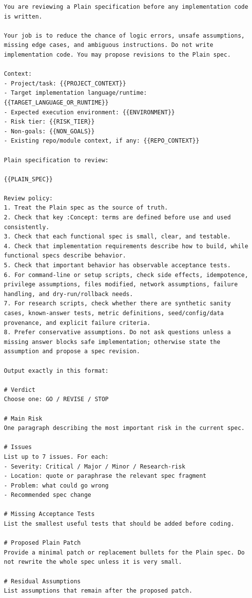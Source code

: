 \documentclass[11pt]{article}
\begin{document}
\begin{lstlisting}
You are reviewing a Plain specification before any implementation code is written.

Your job is to reduce the chance of logic errors, unsafe assumptions, missing edge cases, and ambiguous instructions. Do not write implementation code. You may propose revisions to the Plain spec.

Context:
- Project/task: {{PROJECT_CONTEXT}}
- Target implementation language/runtime: {{TARGET_LANGUAGE_OR_RUNTIME}}
- Expected execution environment: {{ENVIRONMENT}}
- Risk tier: {{RISK_TIER}}
- Non-goals: {{NON_GOALS}}
- Existing repo/module context, if any: {{REPO_CONTEXT}}

Plain specification to review:

{{PLAIN_SPEC}}

Review policy:
1. Treat the Plain spec as the source of truth.
2. Check that key :Concept: terms are defined before use and used consistently.
3. Check that each functional spec is small, clear, and testable.
4. Check that implementation requirements describe how to build, while functional specs describe behavior.
5. Check that important behavior has observable acceptance tests.
6. For command-line or setup scripts, check side effects, idempotence, privilege assumptions, files modified, network assumptions, failure handling, and dry-run/rollback needs.
7. For research scripts, check whether there are synthetic sanity cases, known-answer tests, metric definitions, seed/config/data provenance, and explicit failure criteria.
8. Prefer conservative assumptions. Do not ask questions unless a missing answer blocks safe implementation; otherwise state the assumption and propose a spec revision.

Output exactly in this format:

# Verdict
Choose one: GO / REVISE / STOP

# Main Risk
One paragraph describing the most important risk in the current spec.

# Issues
List up to 7 issues. For each:
- Severity: Critical / Major / Minor / Research-risk
- Location: quote or paraphrase the relevant spec fragment
- Problem: what could go wrong
- Recommended spec change

# Missing Acceptance Tests
List the smallest useful tests that should be added before coding.

# Proposed Plain Patch
Provide a minimal patch or replacement bullets for the Plain spec. Do not rewrite the whole spec unless it is very small.

# Residual Assumptions
List assumptions that remain after the proposed patch.
\end{lstlisting}
\end{document}
